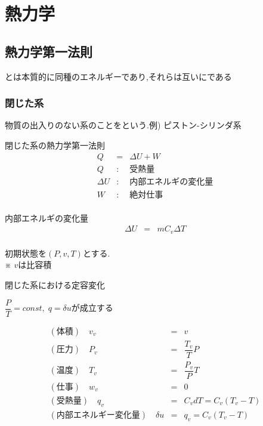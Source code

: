 \documentclass[a4paper]{jsarticle}
\begin{document}
\section{熱力学}
\subsection{熱力学第一法則}
\begin{center}
    とは本質的に同種のエネルギーであり,それらは互いにである
\end{center}
\subsubsection{閉じた系}
物質の出入りのない系のことをという.\quad 例) ピストン-シリンダ系
\begin{itembox}[l]{閉じた系の熱力学第一法則}
    \begin{eqnarray*}
        Q&=&\Delta U+W\\
        Q&:&受熱量\\
        \Delta U&:&内部エネルギの変化量\\
        W&:&絶対仕事\\
    \end{eqnarray*}
\end{itembox}
\begin{itembox}[l]{内部エネルギの変化量}
    \begin{eqnarray*}
        \Delta U&=&mC_v\Delta T\\
    \end{eqnarray*}
\end{itembox}
初期状態を$\left(P,v,T\right)$とする.\\
※ $v$は比容積
\begin{itembox}[l]{閉じた系における定容変化}
    \begin{center}
        $\dfrac{P}{T}=const,\; q=\delta u$が成立する
    \end{center}
    \begin{eqnarray*}
        (体積)\quad v_v&=&v\\
        (圧力)\quad P_v&=&\dfrac{T_v}{T}P\\
        (温度)\quad T_v&=&\dfrac{P_v}{P}T\\
        (仕事)\quad w_v&=&0\\
        (受熱量)\quad q_v&=&C_vdT=C_v\left(T_v-T\right)\\
        (内部エネルギー変化量)\quad \delta u&=&q_v=C_v\left(T_v-T\right)\\
    \end{eqnarray*}
\end{itembox}
\end{document}
